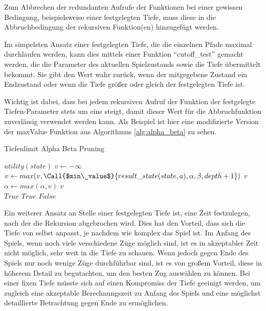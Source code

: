 Zum Abbrechen der redundanten Aufrufe der Funktionen bei einer gewissen Bedingung, beispielsweise einer festgelegten Tiefe, muss diese in die Abbruchbedingung der rekursiven Funktion(en) hinzugefügt werden. 

Im simpelsten Ansatz einer festgelegten Tiefe, die die einzelnen Pfade maximal durchlaufen werden, kann dies mittels einer Funktion ``cutoff\_test'' gemacht werden, die die Parameter des aktuellen Spielzustands sowie die Tiefe übermittelt bekommt. Sie gibt den Wert wahr zurück, wenn der mitgegebene Zustand ein Endzustand oder wenn die Tiefe größer oder gleich der festgelegten Tiefe ist. \cite{Russell2010}

Wichtig ist dabei, dass bei jedem rekursiven Aufruf der Funktion der festgelegte Tiefen-Parameter stets um eins steigt, damit dieser Wert für die Abbruchfunktion zuverlässig verwendet werden kann. Als Beispiel ist hier eine modifizierte Version der maxValue Funktion aus Algorithmus \ref{alg:alpha_beta} zu sehen.

\begin{algorithm}[h]
\caption{Tiefenlimit Alpha Beta Pruning \cite{Russell2010}}
\label{alg:depth_limit}
\begin{algorithmic}
 \State \Return $utility(state)$ \EndIf
\State $v \gets -\infty$
\State $v \gets max(v, \Call{$min\_value$}{result\_state(state, a), \alpha, \beta, depth + 1})$
 \State \Return $v$ \EndIf
\State $\alpha \gets max(\alpha, v)$
\EndFor
\State \Return $v$
\EndFunction
\\
 \State \Return $True$ \EndIf
{} \State \Return $True$ \EndIf
\State \Return $False$
\EndFunction 
\end{algorithmic}
\end{algorithm}

Ein weiterer Ansatz an Stelle einer festgelegten Tiefe ist, eine Zeit festzulegen, nach der die Rekursion abgebrochen wird. Dies hat den Vorteil, dass sich die Tiefe von selbst anpasst, je nachdem wie komplex das Spiel ist. Im Anfang des Spiels, wenn noch viele verschiedene Züge möglich sind, ist es in akzeptabler Zeit nicht möglich, sehr weit in die Tiefe zu schauen. Wenn jedoch gegen Ende des Spiels nur noch wenige Züge durchführbar sind, ist es von großem Vorteil, diese in höherem Detail zu begutachten, um den besten Zug auswählen zu können. Bei einer fixen Tiefe müsste sich auf einen Kompromiss der Tiefe geeinigt werden, um zugleich eine akzeptable Berechnungszeit zu Anfang des Spiels und eine möglichst detaillierte Betrachtung gegen Ende zu ermöglichen.

